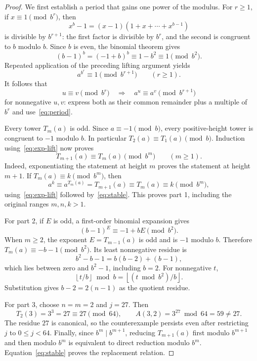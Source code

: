 \documentclass[11pt]{article}
\begin{document}
\begin{proof}
We first establish a period that gains one power of the modulus.
For $r\ge1$, if $x\equiv1\pmod{b^r}$, then
\[
x^b-1=(x-1)(1+x+\cdots+x^{b-1})
\]
is divisible by $b^{r+1}$: the first factor is divisible by $b^r$,
and the second is congruent to $b$ modulo $b$.
Since $b$ is even, the binomial theorem gives
\[
(b-1)^b=(-1+b)^b\equiv1-b^2\equiv1\pmod{b^2}.
\]
Repeated application of the preceding lifting argument yields
\begin{equation}\label{eq:period}
a^{b^r}\equiv1\pmod{b^{r+1}}\qquad(r\ge1).
\end{equation}
It follows that
\begin{equation}\label{eq:exp-lift}
u\equiv v\pmod{b^r}\quad\Longrightarrow\quad
a^u\equiv a^v\pmod{b^{r+1}}
\end{equation}
for nonnegative $u,v$: express both as their common remainder plus
a multiple of $b^r$ and use~\eqref{eq:period}.

Every tower $T_m(a)$ is odd. Since $a\equiv-1\pmod b$, every
positive-height tower is congruent to $-1$ modulo $b$.
In particular $T_2(a)\equiv T_1(a)\pmod b$.
Induction using~\eqref{eq:exp-lift} now proves
\begin{equation}\label{eq:stable}
T_{m+1}(a)\equiv T_m(a)\pmod{b^m}\qquad(m\ge1).
\end{equation}
Indeed, exponentiating the statement at height $m$ proves the statement
at height $m+1$. If $T_m(a)\equiv k\pmod{b^m}$, then
\[
a^k\equiv a^{T_m(a)}=T_{m+1}(a)\equiv T_m(a)\equiv k\pmod{b^m},
\]
using~\eqref{eq:exp-lift} followed by~\eqref{eq:stable}. This proves
part 1, including the original ranges $m,n,k>1$.

For part 2, if $E$ is odd, a first-order binomial expansion gives
\[
(b-1)^E\equiv-1+bE\pmod{b^2}.
\]
When $m\ge2$, the exponent $E=T_{m-1}(a)$ is odd and is $-1$ modulo
$b$. Therefore $T_m(a)\equiv-b-1\pmod{b^2}$. Its least nonnegative
residue is
\[
b^2-b-1=b(b-2)+(b-1),
\]
which lies between zero and $b^2-1$, including $b=2$.
For nonnegative $t$,
\[
\left\lfloor t/b\right\rfloor\bmod b
=\left\lfloor (t\bmod b^2)/b\right\rfloor.
\]
Substitution gives $b-2=2(n-1)$ as the quotient residue.

For part 3, choose $n=m=2$ and $j=27$. Then
\[
T_2(3)=3^3=27\equiv27\pmod{64},\qquad
A(3,2)=3^{27}\bmod64=59\ne27.
\]
The residue $27$ is canonical, so the counterexample persists even
after restricting $j$ to $0\le j<64$.
Finally, since $b^m\mid b^{m+1}$, reducing $T_{m+1}(a)$ first modulo
$b^{m+1}$ and then modulo $b^m$ is equivalent to direct reduction
modulo $b^m$. Equation~\eqref{eq:stable} proves the replacement relation.
\end{proof}
\end{document}
